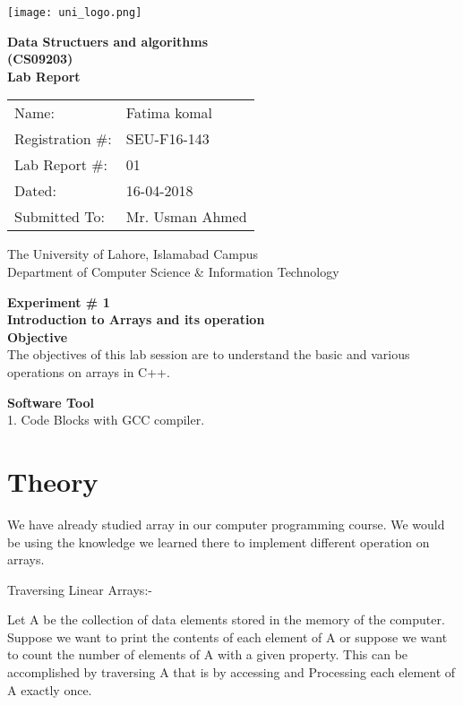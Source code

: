 \documentclass[11pt]{article}            %
\begin{document}
\begin{titlepage}
    \centering
  \vfill
    \texttt{[image: uni\_logo.png]} \\ 
	\vskip2cm
    {\bfseries\Large
	Data Structuers and algorithms \\ (CS09203)\\
	
	\vskip2cm
	Lab Report 
	 
	\vskip2cm
	}    

\begin{center}
\begin{tabular}{ l l  } 

Name: & Fatima komal \\ 
Registration \#: & SEU-F16-143 \\ 
Lab Report \#: & 01 \\ 
 Dated:& 16-04-2018\\ 
Submitted To:& Mr. Usman Ahmed\\ 

\end{tabular}
\end{center}
    \vfill
    The University of Lahore, Islamabad Campus\\
Department of Computer Science \& Information Technology
\end{titlepage}


    
    {\bfseries\Large
\centering
	Experiment \# 1 \\

Introduction to Arrays and its operation\\
	
	}    
 \vskip1cm
 \textbf {Objective}\\ The objectives of this lab session are to understand the basic and various operations on arrays in C++.
 
 \textbf {Software Tool} \\
 1. Code Blocks with GCC compiler.

\section{Theory }              

We have already studied array in our computer programming course. We would be using the knowledge we learned there to implement different operation on arrays.

Traversing Linear Arrays:-

Let A be the collection of data elements stored in the memory of the computer. Suppose we want to print the contents of each element of A or suppose we want to count the number of elements of A with a given property. This can be accomplished by traversing A that is by accessing and Processing each element of A exactly once.
\end{document}
